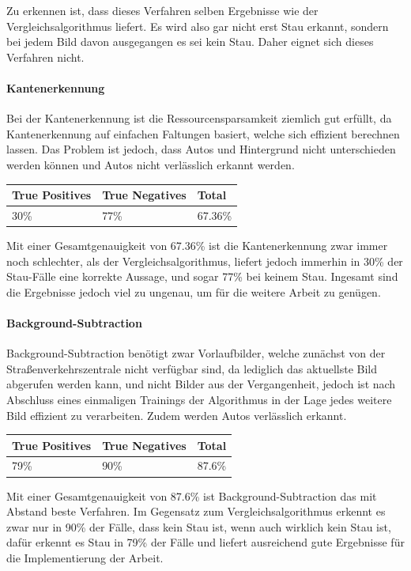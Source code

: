 Zu erkennen ist, dass dieses Verfahren selben Ergebnisse wie der Vergleichsalgorithmus liefert. Es wird also gar nicht erst Stau erkannt, sondern bei jedem Bild davon ausgegangen es sei kein Stau. Daher eignet sich dieses Verfahren nicht.

\paragraph{Kantenerkennung}
Bei der Kantenerkennung ist die Ressourcensparsamkeit ziemlich gut erfüllt, da Kantenerkennung auf einfachen Faltungen basiert, welche sich effizient berechnen lassen.
Das Problem ist jedoch, dass Autos und Hintergrund nicht unterschieden werden können und Autos nicht verlässlich erkannt werden.

\begin{center}
\scriptsize
    \begin{tabular}{ | l | l | l |}
    \hline
		True Positives & True Negatives & Total \\ \hline
    30\% &
		77\% &
		67.36\% \\
    \hline
    \end{tabular}
\end{center}

Mit einer Gesamtgenauigkeit von 67.36\% ist die Kantenerkennung zwar immer noch schlechter, als der Vergleichsalgorithmus, liefert jedoch immerhin in 30\% der Stau-Fälle eine korrekte Aussage, und sogar 77\% bei keinem Stau. Ingesamt sind die Ergebnisse jedoch viel zu ungenau, um für die weitere Arbeit zu genügen.

\paragraph{Background-Subtraction}
Background-Subtraction benötigt zwar Vorlaufbilder, welche zunächst von der Straßenverkehrszentrale nicht verfügbar sind, da lediglich das aktuellste Bild abgerufen werden kann, und nicht Bilder aus der Vergangenheit, jedoch ist nach Abschluss eines einmaligen Trainings der Algorithmus in der Lage jedes weitere Bild effizient zu verarbeiten. Zudem werden Autos verlässlich erkannt.

\begin{center}
\scriptsize
    \begin{tabular}{ | l | l | l |}
    \hline
		True Positives & True Negatives & Total \\ \hline
    79\% &
		90\% &
		87.6\% \\
    \hline
    \end{tabular}
\end{center}

Mit einer Gesamtgenauigkeit von 87.6\% ist Background-Subtraction das mit Abstand beste Verfahren. Im Gegensatz zum Vergleichsalgorithmus erkennt es zwar nur in 90\% der Fälle, dass kein Stau ist, wenn auch wirklich kein Stau ist, dafür erkennt es Stau in 79\% der Fälle und liefert ausreichend gute Ergebnisse für die Implementierung der Arbeit.
